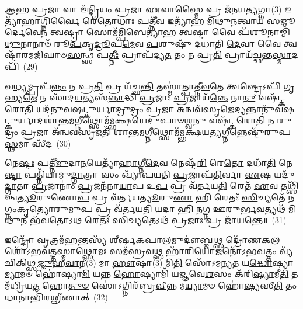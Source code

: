 \-\ul{𑌆}\-\-\ul{𑌹} \ul{𑌪𑍍𑌰}\-𑌜𑌾 𑌵𑌾 𑌇᳴\-\ul{𑌨𑍍𑌦𑍍𑌰𑌿}\-𑌯𑌂 \ul{𑌪𑍍𑌰}\-𑌜𑌾 \ul{𑌏}\-𑌵𑌾\-\ul{𑌸𑍍𑌮𑍈} 𑌪𑍍𑌰 𑌜᳴𑌨\-\ul{𑌯}\-𑌤𑍍𑌯𑌗𑍍𑌨𑌾(3) 𑌇𑌤𑍍𑌯𑌾᳴\-\ul{𑌹𑌾}\-𑌗𑍍𑌨𑌿𑌰𑍍𑌵𑍈 𑌰𑍇᳴\-\ul{𑌤𑍋}\-𑌧𑌾𑌃 𑌪𑌤𑍍𑌨𑍀᳴\-\ul{𑌵} 𑌇𑌤𑍍𑌯𑌾᳴𑌹 𑌮𑌿𑌥𑍁\-\ul{𑌨}\-𑌤𑍍𑌵𑌾𑌯᳴ \ul{𑌸}\-𑌜𑍂\-\ul{𑌰𑍍𑌦𑍇}\-𑌵𑍇\-\ul{𑌨} 𑌤𑍍𑌵\-\ul{𑌷𑍍𑌟𑍍𑌰𑌾} 𑌸𑍋𑌮᳴\-\ul{𑌮𑍍𑌪𑌿}\-𑌬𑍇𑌤𑍍𑌯𑌾᳴\-\ul{𑌹} 𑌤𑍍𑌵\-\ul{𑌷𑍍𑌟𑌾} 𑌵𑍈 𑌪᳴\-\ul{𑌶𑍂}\-𑌨𑌾𑌮𑍍𑌮𑌿᳴\-\ul{𑌥𑍁}\-𑌨𑌾𑌨𑌾𑍞᳴ 𑌰𑍂\-\ul{𑌪}\-𑌕𑍃\-\ul{𑌦𑍍𑌰𑍂}\-𑌪\-\ul{𑌮𑍇}\-𑌵 \ul{𑌪}\-𑌶𑍁𑌷𑍁᳴ 𑌦𑌧𑌾𑌤𑌿 \ul{𑌦𑍇}\-𑌵𑌾 𑌵𑍈 𑌤𑍍𑌵𑌷𑍍𑌟𑌾᳴𑌰𑌮𑌜𑌿𑌘𑌾𑍞\-\ul{𑌸}\-𑌨𑍍𑌥𑍍𑌸 𑌪\-\ul{𑌤𑍍𑌨𑍀𑌃} 𑌪𑍍𑌰𑌾𑌪᳴𑌦𑍍𑌯\-\ul{𑌤} 𑌤𑌂 𑌨 𑌪𑍍𑌰\-\ul{𑌤𑌿} 𑌪𑍍𑌰𑌾𑌯᳴\-\ul{𑌚𑍍𑌛}\-𑌨𑍍𑌤\-\ul{𑌸𑍍𑌮𑌾}\-𑌦𑌪𑌿᳴~(29)

𑌵\-\ul{𑌧𑍍𑌯}\-𑌮𑍍𑌪𑍍𑌰𑌪᳴\-\ul{𑌨𑍍𑌨𑌂} 𑌨 𑌪𑍍𑌰\-\ul{𑌤𑌿} 𑌪𑍍𑌰 𑌯᳴𑌚𑍍𑌛\-\ul{𑌨𑍍𑌤𑌿} 𑌤𑌸𑍍𑌮𑌾॑𑌤𑍍𑌪𑌾𑌤𑍍𑌨𑍀\-\ul{𑌵}\-𑌤𑍇 𑌤𑍍𑌵𑌷𑍍𑌟𑍍𑌰𑍇\-𑌽𑌪𑌿᳴ 𑌗𑍃𑌹𑍍𑌯\-\ul{𑌤𑍇} 𑌨 𑌸𑌾᳴𑌦\-\ul{𑌯}\-𑌤𑍍𑌯𑌸᳴\-\ul{𑌨𑍍𑌨𑌾}\-𑌦𑍍𑌧𑌿 \ul{𑌪𑍍𑌰}\-𑌜𑌾𑌃 \ul{𑌪𑍍𑌰}\-𑌜𑌾𑌯᳴\-\ul{𑌨𑍍𑌤𑍇} 𑌨𑌾\-\ul{𑌨𑍁} 𑌵𑌷᳴𑌟𑍍𑌕𑌰𑍋\-\ul{𑌤𑌿} 𑌯𑌦᳴𑌨𑍁𑌵𑌷\-\ul{𑌟𑍍𑌕𑍁}\-𑌰𑍍𑌯𑌾\-\ul{𑌦𑍍𑌰𑍁}\-𑌦𑍍𑌰𑌂 \ul{𑌪𑍍𑌰}\-𑌜𑌾 \ul{𑌅}\-𑌨𑍍𑌵𑌵᳴𑌸𑍃\-\ul{𑌜𑍇}\-𑌦𑍍𑌯𑌨𑍍𑌨𑌾𑌨𑍁᳴𑌵𑌷\-\ul{𑌟𑍍𑌕𑍁}\-𑌰𑍍𑌯𑌾𑌦𑌶𑌾॑𑌨𑍍𑌤\-\ul{𑌮}\-𑌗𑍍𑌨𑍀𑌥𑍍𑌸𑍋𑌮᳴𑌮𑍍𑌭𑌕𑍍𑌷𑌯𑍇𑌦𑍁\-\ul{𑌪𑌾}\-\-\ul{𑍞}\-𑌶𑍍𑌵\-\ul{𑌨𑍁} 𑌵𑌷᳴𑌟𑍍𑌕𑌰𑍋\-\ul{𑌤𑌿} 𑌨 \ul{𑌰𑍁}\-𑌦𑍍𑌰𑌂 \ul{𑌪𑍍𑌰}\-𑌜𑌾 𑌅᳴𑌨𑍍𑌵𑌵\-\ul{𑌸𑍃}\-𑌜𑌤𑌿᳴ \ul{𑌶𑌾}\-𑌨𑍍𑌤\-\ul{𑌮}\-𑌗𑍍𑌨𑍀𑌥𑍍𑌸𑍋𑌮᳴𑌮𑍍𑌭𑌕𑍍𑌷\-\ul{𑌯}\-𑌤𑍍𑌯\-\ul{𑌗𑍍𑌨𑍀}\-𑌨𑍍𑌨𑍇𑌷𑍍𑌟𑍁᳴\-\ul{𑌰𑍁}\-𑌪\-\ul{𑌸𑍍𑌥}\-𑌮𑌾 𑌸𑍀᳴𑌦~(30)

𑌨𑍇\-\ul{𑌷𑍍𑌟𑌃} 𑌪𑌤𑍍𑌨𑍀᳴\-\ul{𑌮𑍁}\-𑌦𑌾\-\ul{𑌨}\-𑌯𑍇𑌤𑍍𑌯𑌾᳴\-\ul{𑌹𑌾}\-𑌗𑍍𑌨𑍀\-\ul{𑌦𑍇}\-𑌵 𑌨𑍇𑌷𑍍𑌟᳴\-\ul{𑌰𑌿} 𑌰𑍇\-\ul{𑌤𑍋} 𑌦𑌧𑌾᳴\-\ul{𑌤𑌿} 𑌨𑍇\-\ul{𑌷𑍍𑌟𑌾} 𑌪𑌤𑍍𑌨𑌿᳴𑌯𑌾𑌮𑍁\-\ul{𑌦𑍍𑌗𑌾}\-𑌤𑍍𑌰𑌾 𑌸𑌂 𑌖𑍍𑌯𑌾᳴𑌪𑌯𑌤𑌿 \ul{𑌪𑍍𑌰}\-𑌜𑌾𑌪᳴\-\ul{𑌤𑌿}\-𑌰𑍍𑌵𑌾 \ul{𑌏}\-𑌷 𑌯𑌦𑍁᳴\-\ul{𑌦𑍍𑌗𑌾}\-𑌤𑌾 \ul{𑌪𑍍𑌰}\-𑌜𑌾𑌨𑌾𑌂॑ \ul{𑌪𑍍𑌰}\-𑌜𑌨᳴𑌨𑌾\-\ul{𑌯𑌾}\-𑌪 𑌉\-\ul{𑌪} 𑌪𑍍𑌰 𑌵᳴𑌰𑍍𑌤𑌯\-\ul{𑌤𑌿} 𑌰𑍇𑌤᳴ \ul{𑌏}\-𑌵 𑌤𑌥𑍍𑌸𑌿᳴𑌞𑍍𑌚\-\ul{𑌤𑍍𑌯𑍂}\-𑌰𑍁𑌣𑍋\-\ul{𑌪} 𑌪𑍍𑌰 𑌵᳴𑌰𑍍𑌤𑌯\-\ul{𑌤𑍍𑌯𑍂}\-𑌰𑍁\-\ul{𑌣𑌾} 𑌹𑌿 𑌰𑍇𑌤𑌃᳴ \ul{𑌸𑌿}\-𑌚𑍍𑌯𑌤𑍇᳴ 𑌨\-\ul{𑌗𑍍𑌨𑌂}\-𑌕𑍃\-\ul{𑌤𑍍𑌯𑍋}\-𑌰𑍁𑌮𑍁\-\ul{𑌪} 𑌪𑍍𑌰 𑌵᳴𑌰𑍍𑌤𑌯𑌤𑌿 \ul{𑌯}\-𑌦𑌾 𑌹𑌿 \ul{𑌨}\-𑌗𑍍𑌨 \ul{𑌊}\-𑌰𑍁𑌰𑍍𑌭\-\ul{𑌵}\-𑌤𑍍𑌯𑌥᳴ 𑌮𑌿\-\ul{𑌥𑍁}\-𑌨𑍀 𑌭᳴\-\ul{𑌵}\-𑌤𑍋\-𑌽\-\ul{𑌥} 𑌰𑍇𑌤𑌃᳴ 𑌸𑌿\-\ul{𑌚𑍍𑌯}\-𑌤𑍇\-𑌽𑌥᳴ \ul{𑌪𑍍𑌰}\-𑌜𑌾𑌃 𑌪𑍍𑌰 𑌜𑌾᳴𑌯𑌨𑍍𑌤𑍇॥~(31)

{\anuvakamend[{𑌪𑌤𑍍𑌨𑍀𑌃॑ 𑌸𑍁\-\ul{𑌵}\-𑌰𑍍𑌗𑌮𑍁𑌪᳴𑌸𑍍𑌤𑌿𑌤𑌰𑌮𑌿𑌨𑍍𑌦𑍍𑌰𑌿𑌯𑌾\-\ul{𑌵} 𑌇𑌤𑍍𑌯𑌪𑌿᳴ 𑌸𑍀𑌦 𑌮𑌿\-\ul{𑌥𑍁}\-𑌨𑍍𑌯᳴𑌷𑍍𑌟𑍗 𑌚᳴}]}%

𑌇𑌨𑍍𑌦𑍍𑌰𑍋᳴ \ul{𑌵𑍃}\-𑌤𑍍𑌰𑌮᳴\-\ul{𑌹}\-𑌨𑍍𑌤𑌸𑍍𑌯᳴ 𑌶𑍀𑌰𑍍\mbox{}𑌷𑌕\-\ul{𑌪𑌾}\-𑌲𑌮𑍁𑌦𑍗॑\-\ul{𑌬𑍍𑌜}\-𑌥𑍍𑌸 𑌦𑍍𑌰𑍋᳴𑌣𑌕\-\ul{𑌲}\-𑌶𑍋᳴\-𑌽𑌭\-\ul{𑌵}\-𑌤𑍍𑌤\-\ul{𑌸𑍍𑌮𑌾}\-𑌥𑍍𑌸𑍋\-\ul{𑌮𑌃} 𑌸𑌮᳴𑌸𑍍𑌰\-\ul{𑌵}\-𑌥𑍍𑌸 𑌹𑌾᳴𑌰𑌿𑌯𑍋\-\ul{𑌜}\-𑌨𑍋᳴\-𑌽𑌭\-\ul{𑌵}\-𑌤𑍍𑌤𑌂 𑌵𑍍𑌯᳴𑌚𑌿𑌕𑌿𑌥𑍍𑌸\-\ul{𑌜𑍍𑌜𑍁}\-𑌹\-\ul{𑌵𑌾}\-𑌨𑍀(3) 𑌮𑌾 \ul{𑌹𑍗}\-𑌷𑌾(3) 𑌮𑌿\-\ul{𑌤𑌿} 𑌸𑍋᳴\-𑌽𑌮𑌨𑍍𑌯\-\ul{𑌤} 𑌯\-\ul{𑌦𑍍𑌧𑍋}\-𑌷𑍍𑌯𑌾\-\ul{𑌮𑍍𑌯𑌾}\-𑌮𑍞 𑌹𑍋॑𑌷𑍍𑌯𑌾\-\ul{𑌮𑌿} 𑌯𑌨𑍍𑌨 \ul{𑌹𑍋}\-𑌷𑍍𑌯𑌾𑌮𑌿᳴ 𑌯𑌜𑍍𑌞𑌵𑍇\-\ul{𑌶}\-𑌸𑌂 𑌕᳴𑌰𑌿\-\ul{𑌷𑍍𑌯𑌾}\-𑌮𑍀\-\ul{𑌤𑌿} 𑌤𑌮᳴𑌧𑍍𑌰𑌿𑌯\-\ul{𑌤} 𑌹𑍋\-\ul{𑌤𑍁}\-\-\ul{𑍞} 𑌸𑍋॑\-𑌽𑌗𑍍𑌨𑌿𑌰᳴𑌬𑍍𑌰\-\ul{𑌵𑍀}\-𑌨𑍍𑌨 𑌮\-\ul{𑌯𑍍𑌯𑌾}\-𑌮𑍞 𑌹𑍋॑\-\ul{𑌷𑍍𑌯}\-𑌸𑍀\-\ul{𑌤𑌿} 𑌤𑌂 \ul{𑌧𑌾}\-𑌨𑌾𑌭𑌿᳴𑌰𑌶𑍍𑌰𑍀𑌣𑌾𑌤𑍍~(32)

